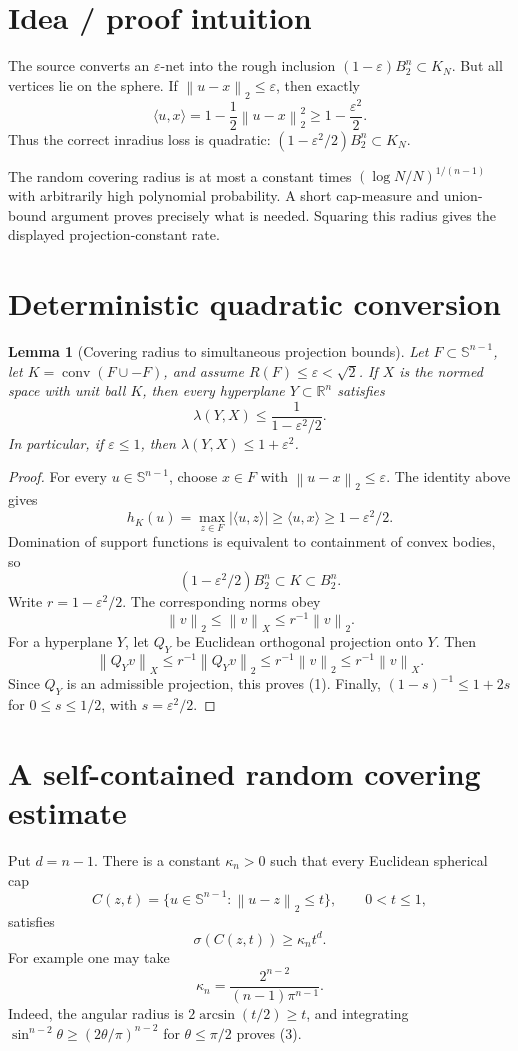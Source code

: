 \documentclass[11pt]{article}
\newtheorem{lemma}{Lemma}
\newcommand{\R}{\mathbb R}
\newcommand{\Sph}{\mathbb S^{n-1}}
\newcommand{\norm}[1]{\left\lVert #1\right\rVert}
\newcommand{\conv}{\operatorname{conv}}
\begin{document}
\section*{Idea / proof intuition}
The source converts an \(\varepsilon\)-net into the rough inclusion
\((1-\varepsilon)B_2^n\subset K_N\).  But all vertices lie on the sphere.
If \(\norm{u-x}_2\leq\varepsilon\), then exactly
\[
 \langle u,x\rangle=1-\frac12\norm{u-x}_2^2
 \geq1-\frac{\varepsilon^2}{2}.
\]
Thus the correct inradius loss is quadratic:
\((1-\varepsilon^2/2)B_2^n\subset K_N\).

The random covering radius is at most a constant times
\((\log N/N)^{1/(n-1)}\) with arbitrarily high polynomial probability.  A
short cap-measure and union-bound argument proves precisely what is needed.
Squaring this radius gives the displayed projection-constant rate.

\section*{Deterministic quadratic conversion}
\begin{lemma}[Covering radius to simultaneous projection bounds]
Let \(F\subset\Sph\), let
\(K=\conv(F\cup-F)\), and assume \(R(F)\leq\varepsilon<\sqrt2\).  If \(X\)
is the normed space with unit ball \(K\), then every hyperplane
\(Y\subset\R^n\) satisfies
\[
 \lambda(Y,X)\leq\frac1{1-\varepsilon^2/2}.
 \tag{1}
\]
In particular, if \(\varepsilon\leq1\), then
\(\lambda(Y,X)\leq1+\varepsilon^2\).
\end{lemma}

\begin{proof}
For every \(u\in\Sph\), choose \(x\in F\) with
\(\norm{u-x}_2\leq\varepsilon\).  The identity above gives
\[
 h_K(u)=\max_{z\in F}|\langle u,z\rangle|
 \geq \langle u,x\rangle\geq1-\varepsilon^2/2.
\]
Domination of support functions is equivalent to containment of convex
bodies, so
\[
 (1-\varepsilon^2/2)B_2^n\subset K\subset B_2^n.       \tag{2}
\]
Write \(r=1-\varepsilon^2/2\).  The corresponding norms obey
\[
 \norm{v}_2\leq\norm{v}_X\leq r^{-1}\norm{v}_2.
\]
For a hyperplane \(Y\), let \(Q_Y\) be Euclidean orthogonal projection onto
\(Y\).  Then
\[
 \norm{Q_Yv}_X\leq r^{-1}\norm{Q_Yv}_2
 \leq r^{-1}\norm{v}_2\leq r^{-1}\norm{v}_X.
\]
Since \(Q_Y\) is an admissible projection, this proves (1).  Finally,
\((1-s)^{-1}\leq1+2s\) for \(0\leq s\leq1/2\), with
\(s=\varepsilon^2/2\).
\end{proof}

\section*{A self-contained random covering estimate}
Put \(d=n-1\).  There is a constant \(\kappa_n>0\) such that every
Euclidean spherical cap
\[
 C(z,t)=\{u\in\Sph:\norm{u-z}_2\leq t\},\qquad 0<t\leq1,
\]
satisfies
\begin{equation}
 \sigma(C(z,t))\geq\kappa_n t^d.                       \tag{3}
\end{equation}
For example one may take
\[
 \kappa_n=\frac{2^{n-2}}{(n-1)\pi^{n-1}}.
\]
Indeed, the angular radius is \(2\arcsin(t/2)\geq t\), and integrating
\(\sin^{n-2}\theta\geq(2\theta/\pi)^{n-2}\) for
\(\theta\leq\pi/2\) proves (3).
\end{document}
